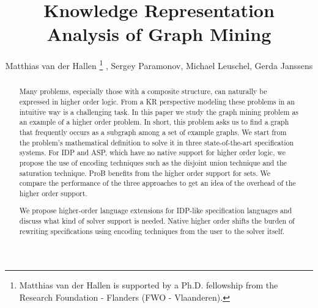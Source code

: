 \documentclass{llncs}
\author{Matthias van der Hallen\dag
\thanks{Matthias van der Hallen is supported by a Ph.D. fellowship from the Research Foundation - Flanders (FWO - Vlaanderen).\vspace{-3em}}
, Sergey Paramonov\dag, Michael Leuschel\ddag, Gerda Janssens\dag}
\title{Knowledge Representation Analysis of Graph Mining}
\institute{\dag KU Leuven, \ddag Heinrich-Heine-Universit\"at D\"usseldorf}
\begin{document}
\maketitle
\begin{abstract}
Many problems, especially those with a composite structure, can naturally be expressed in higher order logic. %
From a KR perspective modeling these problems in an intuitive way is a challenging task.
In this paper we study the graph mining problem as an example of a higher order problem. 
In short, this problem asks us to find a graph that frequently occurs as a subgraph among a set of example graphs.
We start from the problem's mathematical definition 
to solve it
in three state-of-the-art specification systems.
For IDP and ASP, which have no
native support for higher order logic, we propose the use of encoding
techniques such as the disjoint union technique and the saturation technique.
ProB
benefits
from the higher order support for sets.
We compare the performance of the three approaches to get an idea of
the overhead of the higher order support.

We propose higher-order language extensions for IDP-like
specification languages
and  discuss what kind of solver support is needed.
Native higher order shifts the burden of rewriting specifications using encoding techniques from the user to the solver itself.


\end{abstract}
\end{document}
